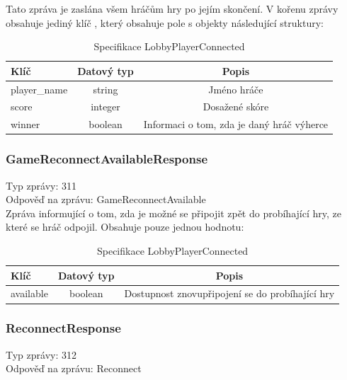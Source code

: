 \documentclass[12pt, a4paper]{article}
\begin{document}
    Tato zpráva je zaslána všem hráčům hry po jejím skončení.
    V kořenu zprávy obsahuje jediný klíč , který obsahuje pole s objekty následující struktury:

    \begin{table}[H]
        \centering
        \begin{tabular}{|l|c|c|}
            \hline
            Klíč & Datový typ & Popis\\
            \hline
            \hline
            player\_name & string & Jméno hráče\\
            \hline
            score & integer & Dosažené skóre\\
            \hline
            winner & boolean & Informaci o tom, zda je daný hráč výherce\\
            \hline
        \end{tabular}
        \caption{Specifikace LobbyPlayerConnected}
    \end{table}

    \subsubsection*{GameReconnectAvailableResponse}
    Typ zprávy: 311\\
    Odpověď na zprávu: GameReconnectAvailable\\

    Zpráva informující o tom, zda je možné se připojit zpět do probíhající hry, ze které se hráč odpojil. Obsahuje pouze jednou hodnotu:

    \begin{table}[H]
        \centering
        \begin{tabular}{|l|c|c|}
            \hline
            Klíč & Datový typ & Popis\\
            \hline
            \hline
            available & boolean & Dostupnost znovupřipojení se do probíhající hry\\
            \hline
        \end{tabular}
        \caption{Specifikace LobbyPlayerConnected}
    \end{table}

    \subsubsection*{ReconnectResponse}
    Typ zprávy: 312\\
    Odpověď na zprávu: Reconnect\\
\end{document}
